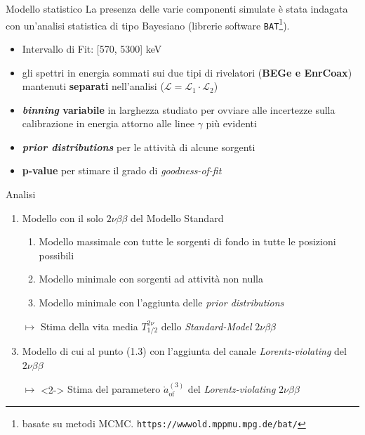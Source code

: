 \documentclass[10pt]{beamer}
\newcommand{\aof}{\mathring{a}_\text{of}^{(3)}}
\newcommand{\nbb}{\nu\beta\beta}
\newcommand{\Tnu}{T_{1/2}^{2\nu}}
\begin{document}
\begin{frame}[label=12]{Modello statistico}
	La presenza delle varie componenti simulate è stata indagata con un'\alert{analisi statistica di tipo Bayesiano} (librerie software \texttt{BAT}\footnote{basate su metodi MCMC. \texttt{https://wwwold.mppmu.mpg.de/bat/}}).
	\begin{itemize}
		\item Intervallo di Fit: [570, 5300] keV
		\item gli spettri in energia sommati sui due tipi di rivelatori (\textbf{BEGe e EnrCoax}) mantenuti \textbf{separati} nell'analisi ($\mathcal{L}=\mathcal{L}_1\cdot\mathcal{L}_2$)
		\item \textbf{\textit{binning} variabile} in larghezza studiato per ovviare alle incertezze sulla calibrazione in energia attorno alle linee $\gamma$ più evidenti
		\item \textbf{\textit{prior distributions}} per le attività di alcune sorgenti
		\item \textbf{p-value} per stimare il grado di \textit{goodness-of-fit}
	\end{itemize}
\end{frame}
\begin{frame}[label=16]{Analisi}
	\begin{enumerate}
		\item Modello con il solo $2\nbb$ del Modello Standard
		\begin{enumerate}
			\item Modello massimale con tutte le sorgenti di fondo in tutte le posizioni possibili
			\item Modello minimale con sorgenti ad attività non nulla
			\item Modello minimale con l'aggiunta delle \textit{prior distributions}
		\end{enumerate}
		\item[$\longmapsto$] \alert{Stima della vita media $\Tnu$ dello \textit{Standard-Model} $2\nbb$}
		\item<2-> Modello di cui al punto (1.3) con l'aggiunta del canale \textit{Lorentz-violating} del $2\nbb$
		\item[$\longmapsto$]<2-> \alert{Stima del parametero $\aof$ del \textit{Lorentz-violating} $2\nbb$}
	\end{enumerate}
\end{frame}
\tikzexternaldisable
\end{document}
